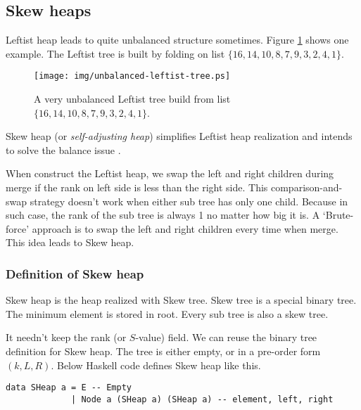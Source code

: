 \documentclass{article}
\begin{document}

\subsection{Skew heaps}
\label{skew-heap}

Leftist heap leads to quite unbalanced structure sometimes. Figure \ref{fig:unbalanced-leftist-tree}
shows one example. The Leftist tree is built by folding on
list $\{16, 14, 10, 8, 7, 9, 3, 2, 4, 1\}$.

\begin{figure}[htbp]
   \begin{center}
   	  \texttt{[image: img/unbalanced-leftist-tree.ps]}
    \caption{A very unbalanced Leftist tree build from list $\{16, 14, 10, 8, 7, 9, 3, 2, 4, 1\}$.}
    \label{fig:unbalanced-leftist-tree}
   \end{center}
\end{figure}

Skew heap (or {\em self-adjusting heap}) simplifies Leftist heap realization
and intends to solve the balance issue\cite{wiki-skew-heap} \cite{self-adjusting-heaps}.

When construct the Leftist heap, we swap the left and right children during merge
if the rank on left side is less than the right side. This comparison-and-swap strategy
doesn't work when either sub tree has only one child. Because
in such case, the rank of the sub tree is always 1 no matter how
big it is. A `Brute-force' approach is to swap the left and right children
every time when merge. This idea leads to Skew heap.

\subsubsection{Definition of Skew heap}

Skew heap is the heap realized with Skew tree. Skew tree is a special
binary tree. The minimum element is stored in root. Every sub tree is
also a skew tree.

It needn't keep the rank (or $S$-value) field. We can reuse the
binary tree definition for Skew heap. The tree is either empty,
or in a pre-order form $(k, L, R)$. Below Haskell code defines
Skew heap like this.

\lstset{language=Haskell}
\begin{lstlisting}
data SHeap a = E -- Empty
             | Node a (SHeap a) (SHeap a) -- element, left, right
\end{lstlisting}
\end{document}
